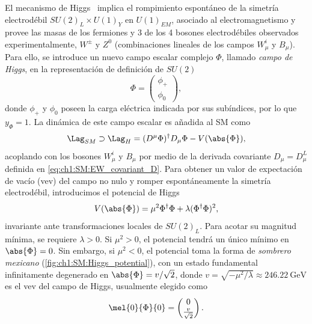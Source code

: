 El mecanismo de Higgs~\cite{Higgs1964} implica el rompimiento espontáneo de la simetría electrodébil $SU(2)_L \times U(1)_Y$ en $U(1)_{EM}$, asociado al electromagnetismo y provee las masas de los fermiones y 3 de los 4 bosones electrodébiles observados experimentalmente, $W^\pm$ y $Z^0$ (combinaciones lineales de los campos $W^i_\mu$ y $B_\mu$). Para ello, se introduce un nuevo campo escalar complejo $\Phi$, llamado \textit{campo de Higgs}, en la representación de definición de $SU(2)$
\[ \Phi = \begin{pmatrix} \phi_+ \\ \phi_0 \end{pmatrix}, \]
donde $\phi_+$ y $\phi_0$ poseen la carga eléctrica indicada por sus subíndices, por lo que $y_\Phi = 1$. La dinámica de este campo escalar es añadida al SM como
\[ \Lag_{SM} \supset \Lag_{H} = (D^\mu \Phi)^\dagger D_\mu \Phi - V(\abs{\Phi}), \]
acoplando con los bosones $W^i_\mu$ y $B_\mu$ por medio de la derivada covariante $D_\mu = D^L_\mu$ definida en \eqref{eq:ch1:SM:EW_covariant_D}. Para obtener un valor de expectación de vacío (vev) del campo no nulo y romper espontáneamente la simetría electrodébil, introducimos el potencial de Higgs
\[ V(\abs{\Phi}) = \mu^2 \Phi^\dagger \Phi + \lambda (\Phi^\dagger \Phi)^2, \]
invariante ante transformaciones locales de $SU(2)_L$. Para acotar su magnitud mínima, se requiere $\lambda > 0$. Si $\mu^2 > 0$, el potencial tendrá un único mínimo en $\abs{\Phi} = 0$. Sin embargo, si $\mu^2 < 0$, el potencial toma la forma de \textit{sombrero mexicano} (\cref{fig:ch1:SM:Higgs_potential}), con un estado fundamental infinitamente degenerado en $\abs{\Phi} = v/\sqrt{2}$, donde $v = \sqrt{-\mu^2/\lambda} \approx \SI{246.22}{\GeV}$ es el vev del campo de Higgs, usualmente elegido como
\[ \mel{0}{\Phi}{0} = \begin{pmatrix} 0 \\ \frac{v}{\sqrt{2}} \end{pmatrix}. \]

